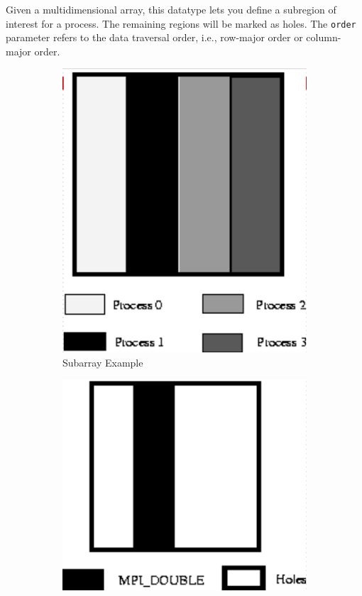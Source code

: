 \documentclass[12pt]{book}
\begin{document}
Given a multidimensional array, this datatype lets you define a subregion of interest for a process. The remaining regions will be marked as holes. The \texttt{order} parameter refers to the data traversal order, i.e., row-major order or column-major order.
\begin{figure}[H]
    \centering
    \begin{subfigure}[b]{0.3\linewidth}
        \centering
        \includegraphics[width=\linewidth]{images/subarray_example.png}
        \caption{Subarray Example}
        \label{fig:subarray_example}
    \end{subfigure}
    \hfill
    \begin{subfigure}[b]{0.4\linewidth}
        \centering
        \includegraphics[width=\linewidth]{images/sub_examp.png}

\end{subfigure}
\end{figure}
\end{document}
